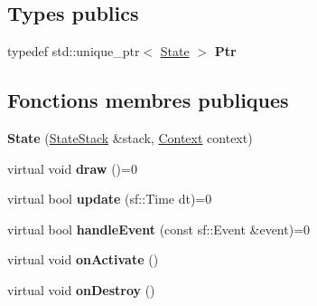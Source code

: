 \subsection*{Types publics}
\begin{DoxyCompactItemize}
\item 
\hypertarget{class_state_a71d9930be1a58be7f711e245b7965d48}{}\label{class_state_a71d9930be1a58be7f711e245b7965d48} 
typedef std\+::unique\+\_\+ptr$<$ \hyperlink{class_state}{State} $>$ {\bfseries Ptr}
\end{DoxyCompactItemize}
\subsection*{Fonctions membres publiques}
\begin{DoxyCompactItemize}
\item 
\hypertarget{class_state_afede488ff3c1b264bbd07f8aeead84a7}{}\label{class_state_afede488ff3c1b264bbd07f8aeead84a7} 
{\bfseries State} (\hyperlink{class_state_stack}{State\+Stack} \&stack, \hyperlink{struct_state_1_1_context}{Context} context)
\item 
\hypertarget{class_state_ae261605bc40b7e3959ce5df5457e4942}{}\label{class_state_ae261605bc40b7e3959ce5df5457e4942} 
virtual void {\bfseries draw} ()=0
\item 
\hypertarget{class_state_acd5926bc7a373edff9e57f3ffe94ca13}{}\label{class_state_acd5926bc7a373edff9e57f3ffe94ca13} 
virtual bool {\bfseries update} (sf\+::\+Time dt)=0
\item 
\hypertarget{class_state_a19965f83460b248c42952aac8d001206}{}\label{class_state_a19965f83460b248c42952aac8d001206} 
virtual bool {\bfseries handle\+Event} (const sf\+::\+Event \&event)=0
\item 
\hypertarget{class_state_ab1d1055fee2e667a6f4c71218b5f586a}{}\label{class_state_ab1d1055fee2e667a6f4c71218b5f586a} 
virtual void {\bfseries on\+Activate} ()
\item 
\hypertarget{class_state_a7b3d30b1014c6a21d0d8b59890402cbd}{}\label{class_state_a7b3d30b1014c6a21d0d8b59890402cbd} 
virtual void {\bfseries on\+Destroy} ()
\end{DoxyCompactItemize}
